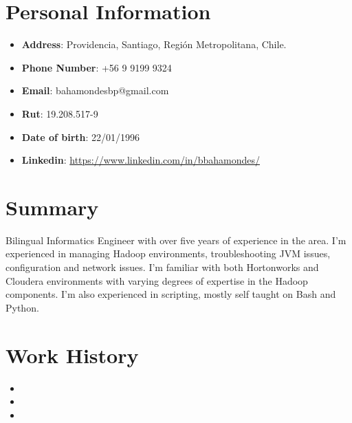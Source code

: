\documentclass[11pt,a4paper,roman]{moderncv}        %
\begin{document}
\makecvtitle
\vspace*{-15mm}

\section{Personal Information}

\begin{itemize}
\item{\textbf{Address}: Providencia, Santiago, Región Metropolitana, Chile.}
\item{\textbf{Phone Number}: +56 9 9199 9324}
\item{\textbf{Email}: bahamondesbp@gmail.com}
\item{\textbf{Rut}: 19.208.517-9}
\item{\textbf{Date of birth}: 22/01/1996}
\item{\textbf{Linkedin}: \url{https://www.linkedin.com/in/bbahamondes/}}
\end{itemize}


\section{Summary}
\small{Bilingual Informatics Engineer with over five years of experience in the area. I'm experienced in managing Hadoop environments, troubleshooting JVM issues, configuration and network issues. I'm familiar with both Hortonworks and Cloudera environments with varying degrees of expertise in the Hadoop components. I'm also experienced in scripting, mostly self taught on Bash and Python.}

\section{Work History}
\begin{itemize}
\item{}
\vspace{3pt}
\item{}
\vspace{3pt}
\item{}
\end{itemize}
\end{document}
